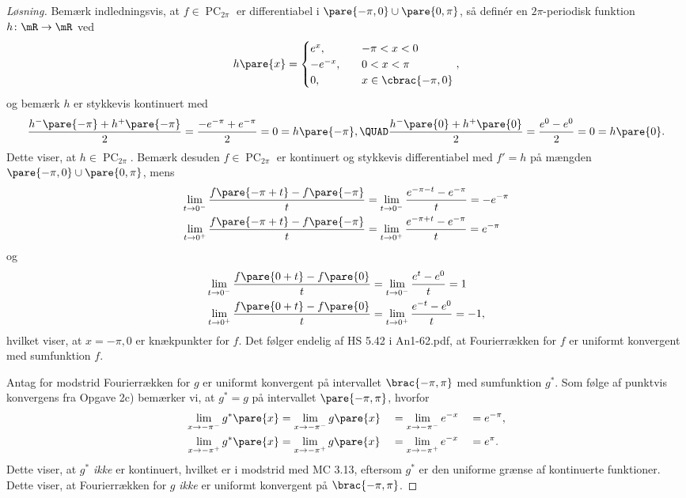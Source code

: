 \begin{opg}
\begin{enumerate}
\begin{proof}[Løsning]
Bemærk indledningsvis, at $f\in\operatorname{PC}_{2\pi}$ er differentiabel i $\pare{-\pi,0}\cup\pare{0,\pi}$, så definér en $2\pi$-periodisk funktion $h\colon \mR\to\mR$ ved
$$ h\pare{x} = \begin{cases}
    e^x, &\quad -\pi< x< 0 \\
    -e^{-x}, &\quad 0 < x < \pi \\
    0, &\quad x \in\cbrac{-\pi,0}
\end{cases}, $$
og bemærk $h$ er stykkevis kontinuert med
$$ \frac{h^-\pare{-\pi} + h^+\pare{-\pi}}{2} = \frac{-e^{-\pi} + e^{-\pi}}{2} = 0 = h\pare{-\pi}, \QUAD
    \frac{h^-\pare{0} + h^+\pare{0}}{2} = \frac{e^0 - e^0}{2} = 0
        = h\pare{0}. $$
Dette viser, at $h\in\operatorname{PC}_{2\pi}$. Bemærk desuden $f\in\operatorname{PC}_{2\pi}$ er kontinuert og stykkevis differentiabel med $f' = h$ på mængden $\pare{-\pi,0}\cup\pare{0,\pi}$, mens
\begin{align*}
    \lim_{t\to 0^-} \frac{f\pare{-\pi + t} - f\pare{-\pi}}{t}
        &= \lim_{t\to 0^-}\frac{e^{-\pi - t} - e^{-\pi}}{t} = -e^{-\pi} \\
    \lim_{t\to 0^+} \frac{f\pare{-\pi + t} - f\pare{-\pi}}{t}
        &= \lim_{t\to 0^+} \frac{e^{-\pi + t} - e^{-\pi}}{t} = e^{-\pi}
\end{align*}
og
\begin{align*}
\lim_{t\to 0^-} \frac{f\pare{0 + t} - f\pare{0}}{t}
        &= \lim_{t\to 0^-}\frac{e^{t} - e^{0}}{t} = 1 \\
    \lim_{t\to 0^+} \frac{f\pare{0 + t} - f\pare{0}}{t}
        &= \lim_{t\to 0^+} \frac{e^{-t} - e^{0}}{t} = -1,
\end{align*}
hvilket viser, at $x = -\pi,0$ er knækpunkter for $f$. Det følger endelig af HS 5.42 i An1-62.pdf, at Fourierrækken for $f$ er uniformt konvergent med sumfunktion $f$.

Antag for modstrid Fourierrækken for $g$ er uniformt konvergent på intervallet $\brac{-\pi,\pi}$ med sumfunktion $g^*$. Som følge af punktvis konvergens fra Opgave 2c) bemærker vi, at $g^* = g$ på intervallet $\pare{-\pi,\pi}$, hvorfor
\begin{alignat*}{3}
    \lim_{x\to -\pi^-} g^*\pare{x} &= \lim_{x\to -\pi^-} g\pare{x}
        &&= \lim_{x\to -\pi^-} e^{-x} &&= e^{-\pi}, \\
    \lim_{x\to -\pi^+} g^*\pare{x} &= \lim_{x\to -\pi^+} g\pare{x}
        &&= \lim_{x\to -\pi^+} e^{-x} &&= e^\pi. \\
\end{alignat*}
Dette viser, at $g^*$ \textit{ikke} er kontinuert, hvilket er i modstrid med  MC 3.13, eftersom $g^*$ er den uniforme grænse af kontinuerte funktioner. Dette viser, at Fourierrækken for $g$ \textit{ikke} er uniformt konvergent på $\brac{-\pi,\pi}$.
\end{proof}


\end{enumerate}
\end{opg}
